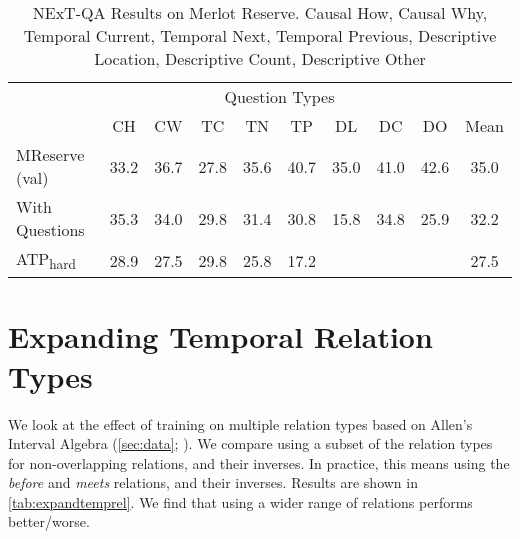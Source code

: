 \begin{table}[htpb]
	\centering
	\caption{NExT-QA Results on Merlot Reserve. Causal How, Causal Why,
	Temporal Current, Temporal Next, Temporal Previous, Descriptive Location,
	Descriptive Count, Descriptive Other}
	\label{tab:nextqa}
	\begin{tabular}{lccccccccc}
		\toprule
		\multicolumn{1}{c}{}  & \multicolumn{8}{c}{Question Types} & \multicolumn{1}{c}{}   \\
                                      \cmidrule(){2-9}
							  &  CH  &  CW  &  TC  &  TN  &  TP  &  DL  &  DC  &  DO  & Mean \\
		\cmidrule(r){1-1}             \cmidrule(){2-9}						 \cmidrule(){10-10}
		MReserve (val)        & 33.2 & 36.7 & 27.8 & 35.6 & 40.7 & 35.0 & 41.0 & 42.6 & 35.0 \\
		With Questions		  & 35.3 & 34.0 & 29.8 & 31.4 & 30.8 & 15.8 & 34.8 & 25.9 & 32.2 \\
		\midrule
		ATP\textsubscript{hard}	&	28.9 & 27.5 & 29.8 & 25.8 &	17.2 &  	&      &      & 27.5 \\
		\midrule
		\bottomrule
	\end{tabular}
\end{table}



\section{Expanding Temporal Relation Types}
\label{sec:expandtemprel}

We look at the effect of training on multiple relation types based on Allen's
Interval Algebra (\cref{sec:data}; \citet{allen1983interval}). We compare using
a subset of the relation types for non-overlapping relations, and their
inverses. In practice, this means using the \textit{before} and \textit{meets}
relations, and their inverses. Results are shown in \cref{tab:expandtemprel}.
We find that using a wider range of relations performs better/worse.

